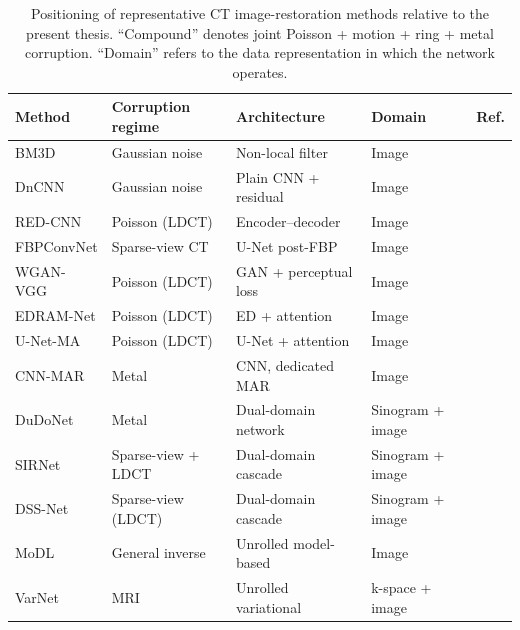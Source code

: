 \begin{table}[!htb]
    \centering
    \caption[Positioning of representative CT restoration methods.]{Positioning of representative CT image-restoration methods relative to the present thesis.
    ``Compound'' denotes joint Poisson + motion + ring + metal corruption. ``Domain'' refers to the data representation in which the network operates.}
    \label{tab:related_work}
    \footnotesize
    \setlength{\tabcolsep}{3pt}
    \begin{tabular}{@{}l l l l c@{}}
        \toprule
        Method        & Corruption regime    & Architecture           & Domain           & Ref. \\
        \midrule
        BM3D          & Gaussian noise       & Non-local filter       & Image            & \cite{Dabov2007}      \\
        DnCNN         & Gaussian noise       & Plain CNN + residual   & Image            & \cite{Zhang2017}      \\
        RED-CNN       & Poisson (LDCT)       & Encoder--decoder       & Image            & \cite{Chen2017}       \\
        FBPConvNet    & Sparse-view CT       & U-Net post-FBP         & Image            & \cite{Jin2017}        \\
        WGAN-VGG      & Poisson (LDCT)       & GAN + perceptual loss  & Image            & \cite{Yang2018WGAN}   \\
        EDRAM-Net     & Poisson (LDCT)       & ED + attention         & Image            & \cite{Komolafe2024}   \\
        U-Net-MA      & Poisson (LDCT)       & U-Net + attention      & Image            & \cite{Zhang2023}      \\
        CNN-MAR       & Metal                & CNN, dedicated MAR     & Image            & \cite{ZhangYu2018}    \\
        DuDoNet       & Metal                & Dual-domain network    & Sinogram + image & \cite{Lin2019DuDoNet} \\
        SIRNet        & Sparse-view + LDCT   & Dual-domain cascade    & Sinogram + image & \cite{Wang2020}       \\
        DSS-Net       & Sparse-view (LDCT)   & Dual-domain cascade    & Sinogram + image & \cite{Zhang2022}      \\
        MoDL          & General inverse      & Unrolled model-based   & Image            & \cite{Aggarwal2019MoDL} \\
        VarNet        & MRI                  & Unrolled variational   & k-space + image  & \cite{Hammernik2018VarNet} \\

\end{tabular}
\end{table}
